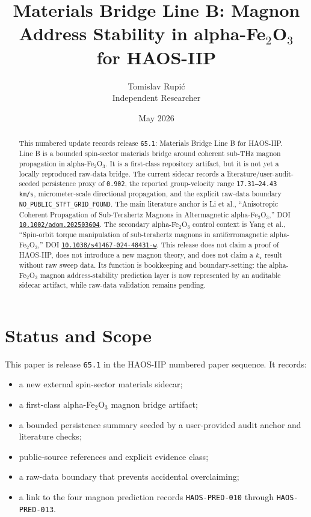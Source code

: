 \documentclass[11pt]{article}
\title{Materials Bridge Line B: Magnon Address Stability in alpha-Fe$_2$O$_3$ for HAOS-IIP}
\author{Tomislav Rupi\'c \\ Independent Researcher}
\date{May 2026}
\begin{document}
\maketitle

\begin{abstract}
This numbered update records release \texttt{65.1}: Materials Bridge Line B for HAOS-IIP. Line B is a bounded spin-sector materials bridge around coherent sub-THz magnon propagation in alpha-Fe$_2$O$_3$. It is a first-class repository artifact, but it is not yet a locally reproduced raw-data bridge. The current sidecar records a literature/user-audit-seeded persistence proxy of \texttt{0.902}, the reported group-velocity range \texttt{17.31--24.43 km/s}, micrometer-scale directional propagation, and the explicit raw-data boundary \texttt{NO\_PUBLIC\_STFT\_GRID\_FOUND}. The main literature anchor is Li et al., ``Anisotropic Coherent Propagation of Sub-Terahertz Magnons in Altermagnetic alpha-Fe$_2$O$_3$,'' DOI \href{https://doi.org/10.1002/adom.202503604}{\texttt{10.1002/adom.202503604}}. The secondary alpha-Fe$_2$O$_3$ control context is Yang et al., ``Spin-orbit torque manipulation of sub-terahertz magnons in antiferromagnetic alpha-Fe$_2$O$_3$,'' DOI \href{https://doi.org/10.1038/s41467-024-48431-w}{\texttt{10.1038/s41467-024-48431-w}}. This release does not claim a proof of HAOS-IIP, does not introduce a new magnon theory, and does not claim a \(k_\star\) result without raw sweep data. Its function is bookkeeping and boundary-setting: the alpha-Fe$_2$O$_3$ magnon address-stability prediction layer is now represented by an auditable sidecar artifact, while raw-data validation remains pending.
\end{abstract}

\tableofcontents

\section{Status and Scope}

This paper is release \texttt{65.1} in the HAOS-IIP numbered paper sequence.
It records:

\begin{itemize}
\item a new external spin-sector materials sidecar;
\item a first-class alpha-Fe$_2$O$_3$ magnon bridge artifact;
\item a bounded persistence summary seeded by a user-provided audit anchor and literature checks;
\item public-source references and explicit evidence class;
\item a raw-data boundary that prevents accidental overclaiming;
\item a link to the four magnon prediction records \texttt{HAOS-PRED-010} through \texttt{HAOS-PRED-013}.
\end{itemize}
\end{document}
